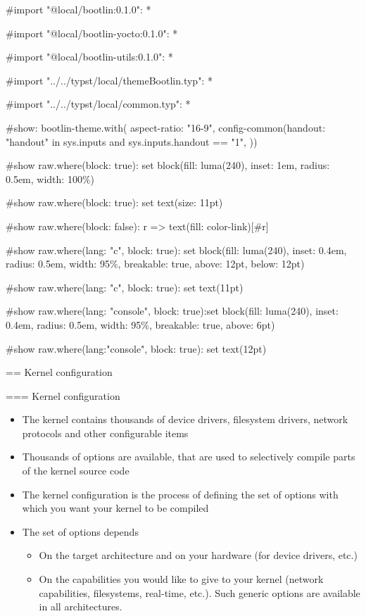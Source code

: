 #import "@local/bootlin:0.1.0": *

#import "@local/bootlin-yocto:0.1.0": *

#import "@local/bootlin-utils:0.1.0": *

#import "../../typst/local/themeBootlin.typ": *

#import "../../typst/local/common.typ": *

#show: bootlin-theme.with( aspect-ratio: "16-9", config-common(handout: "handout" in sys.inputs and sys.inputs.handout == "1", ))

#show raw.where(block: true): set block(fill: luma(240), inset: 1em, radius: 0.5em, width: 100\%)

#show raw.where(block: true): set text(size: 11pt)

#show raw.where(block: false): r => text(fill: color-link)[#r]

#show raw.where(lang: "c", block: true): set block(fill: luma(240), inset: 0.4em, radius: 0.5em, width: 95\%, breakable: true, above: 12pt, below: 12pt)

#show raw.where(lang: "c", block: true): set text(11pt)

#show raw.where(lang: "console", block: true):set block(fill: luma(240), inset: 0.4em, radius: 0.5em, width: 95\%, breakable: true, above: 6pt)

#show raw.where(lang:"console", block: true): set text(12pt)

 == Kernel configuration

=== Kernel configuration
  \begin{itemize}
  \item The kernel contains thousands of device drivers, filesystem
    drivers, network protocols and other configurable items
  \item Thousands of options are available, that are used to
    selectively compile parts of the kernel source code
  \item The kernel configuration is the process of defining the set of
    options with which you want your kernel to be compiled
  \item The set of options depends
    \begin{itemize}
    \item On the target architecture and on your hardware (for device drivers, etc.)
    \item On the capabilities you would like to give to your kernel
      (network capabilities, filesystems, real-time, etc.).
      Such generic options are available in all architectures.
    \end{itemize}
  \end{itemize}


